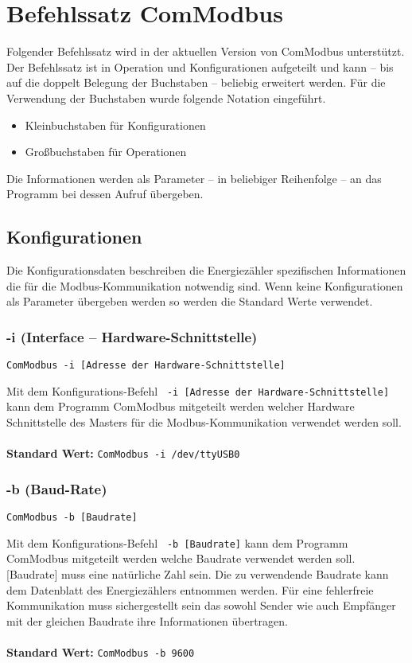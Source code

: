 \documentclass[Bachelorarbeit.tex]{subfiles}
\begin{document}
\chapter{Befehlssatz ComModbus}
\label{chap:befehlssatz_comModbus}
Folgender Befehlssatz wird in der aktuellen Version von ComModbus unterstützt. Der Befehlssatz ist in Operation und Konfigurationen aufgeteilt und kann – bis auf die doppelt Belegung der Buchstaben – beliebig erweitert werden. 
Für die Verwendung der Buchstaben wurde folgende Notation eingeführt. 

\begin{itemize}
\item Kleinbuchstaben für Konfigurationen
\item Großbuchstaben für Operationen 
\end{itemize}

Die Informationen werden als Parameter – in beliebiger Reihenfolge –  an das Programm bei dessen Aufruf übergeben.

\section{Konfigurationen}
\label{sec:befehl_konfiguration}
Die Konfigurationsdaten beschreiben die Energiezähler spezifischen Informationen die für die Modbus-Kommunikation notwendig sind. Wenn keine Konfigurationen als Parameter übergeben werden so werden die Standard Werte verwendet.

\subsection*{-i (Interface – Hardware-Schnittstelle)}

\begin{verbatim}
ComModbus -i [Adresse der Hardware-Schnittstelle]
\end{verbatim}
Mit dem Konfigurations-Befehl \texttt{ -i [Adresse der Hardware-Schnittstelle]} kann dem Programm ComModbus mitgeteilt werden welcher Hardware Schnittstelle des Masters für die Modbus-Kommunikation verwendet werden soll.\\
\\
\textbf{Standard Wert:} \tab \texttt{ComModbus -i /dev/ttyUSB0}

\subsection*{-b (Baud-Rate)}
\begin{verbatim}
ComModbus -b [Baudrate]
\end{verbatim}
Mit dem Konfigurations-Befehl \texttt{ -b [Baudrate]} kann dem Programm ComModbus mitgeteilt werden welche Baudrate verwendet werden soll. [Baudrate] muss eine natürliche Zahl sein. Die zu verwendende Baudrate kann dem Datenblatt des Energiezählers entnommen werden. Für eine fehlerfreie Kommunikation muss sichergestellt sein das sowohl Sender wie auch Empfänger mit der gleichen Baudrate ihre Informationen übertragen.\\
\\
\textbf{Standard Wert:} \tab \texttt{ComModbus -b 9600}
\end{document}
